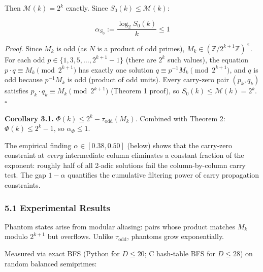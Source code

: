 \documentclass[
  11pt,
]{article}
\begin{document}
Then \(\mathcal{M}(k) = 2^k\) exactly. Since \(S_0(k) \leq \mathcal{M}(k)\):

\[\alpha_{S_0} := \frac{\log_2 S_0(k)}{k} \leq 1\]

\emph{Proof.} Since \(M_k\) is odd (as \(N\) is a product of odd primes),
\(M_k \in (\mathbb{Z}/2^{k+1}\mathbb{Z})^{\times}\). For each odd
\(p \in \lbrace{}1, 3, 5, \ldots, 2^{k+1}-1\rbrace{}\) (there are \(2^k\) such
values), the equation \(p \cdot q \equiv M_k \pmod{2^{k+1}}\) has exactly one
solution \(q \equiv p^{-1} M_k \pmod{2^{k+1}}\), and \(q\) is odd because
\(p^{-1} M_k\) is odd (product of odd units). Every carry-zero pair
\((p_k, q_k)\) satisfies \(p_k \cdot q_k \equiv M_k \pmod{2^{k+1}}\) (Theorem 1
proof), so \(S_0(k) \leq \mathcal{M}(k) = 2^k\). \(\square\)

\textbf{Corollary 3.1.} \(\Phi(k) \leq 2^k - \tau_{\text{odd}}(M_k)\). Combined
with Theorem 2: \(\Phi(k) \leq 2^k - 1\), so \(\alpha_\Phi \leq 1\).

The empirical finding \(\alpha \in [0.38, 0.50]\) (below) shows that the
carry-zero constraint at \emph{every} intermediate column eliminates a constant
fraction of the exponent: roughly half of all 2-adic solutions fail the
column-by-column carry test. The gap \(1 - \alpha\) quantifies the cumulative
filtering power of carry propagation constraints.

\subsubsection{5.1 Experimental Results}\label{experimental-results}

Phantom states arise from modular aliasing: pairs whose product matches \(M_k\)
modulo \(2^{k+1}\) but overflows. Unlike \(\tau_{\text{odd}}\), phantoms grow
exponentially.

Measured via exact BFS (Python for \(D \leq 20\); C hash-table BFS for
\(D \leq 28\)) on random balanced semiprimes:
\end{document}
